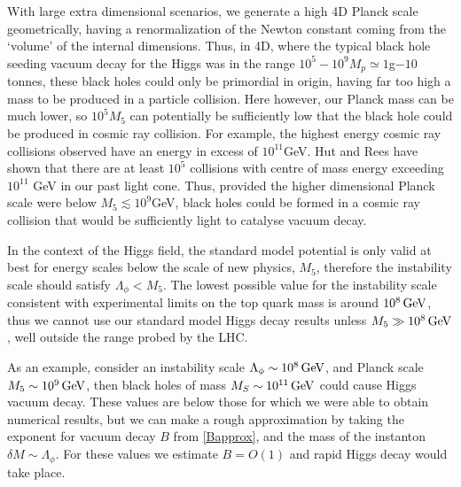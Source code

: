 \documentclass[aps,12pt,prd,superscriptaddress,preprintnumbers, 
	amssymb,
	amsmath,
	notitlepage,
	longbibliography,
	nofootinbib]{revtex4-1}
\begin{document}
With large extra dimensional scenarios, we generate a high 4D Planck 
scale geometrically, having a renormalization of the Newton constant
coming from the `volume' of the internal dimensions. Thus, in 4D, where
the typical black hole seeding vacuum decay for the Higgs was
in the range $10^5-10^9 M_p \simeq 1$g$-10$ tonnes, these black
holes could only be primordial in origin, having far too high a mass to be 
produced in a particle collision. Here however, our Planck mass can be much 
lower, so $10^5 M_5$ can potentially be sufficiently low that the black hole
could be produced in cosmic ray collision. For example,
the highest energy cosmic ray collisions
\cite{Linsley:1963km,Nagano:2000ve,ThePierreAuger:2015rha} observed
have an energy in excess of $10^{11}$GeV. 
Hut and Rees \cite{Hut:1983xa} have shown that there are
at least $10^5$ collisions with centre of mass energy exceeding $10^{11}$ GeV in our
past light cone. Thus, provided the higher dimensional
Planck scale were below $M_5\lesssim 10^9$GeV, black holes could
be formed in a cosmic ray collision that would be sufficiently light to
catalyse vacuum decay.

In the context of the Higgs field, the standard model potential is only 
valid at best for energy scales below the scale of new physics, $M_5$,
therefore the instability scale should satisfy $\Lambda_\phi<M_5$.
The lowest possible value for the instability scale consistent with experimental 
limits on the top quark mass is around $10^8\,{\rm GeV}$, thus we cannot use
our standard model Higgs decay results unless $M_5\gg10^8\,{\rm GeV}$,
well outside the range probed by the LHC. 

As an example, consider an instability scale $\Lambda_\phi\sim 10^{8}\,{\rm GeV}$,
and Planck scale $M_5\sim10^{9}\,{\rm GeV}$, then black holes of mass 
$M_S\sim10^{11}\,{\rm GeV}$ could cause Higgs vacuum decay. 
These values are below those for which we were able
to obtain numerical results, but we can make a rough approximation by
taking the exponent for vacuum decay $B$ from \eqref{Bapprox}, and 
the mass of the instanton $\delta M\sim \Lambda_\phi$. For these
values we estimate $B=O(1)$ and rapid Higgs decay would take place.
\end{document}
